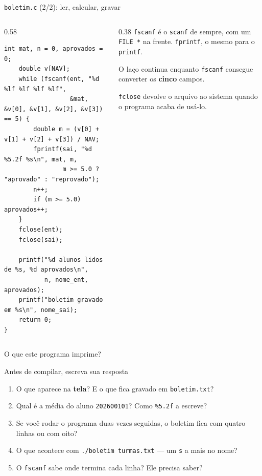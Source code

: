 \documentclass[aspectratio=169]{beamer}
\begin{document}
\begin{frame}[fragile]{\texttt{boletim.c} (2/2): ler, calcular, gravar}
  \vspace{-0.6em}
  \begin{columns}[T]
    \begin{column}{0.58\textwidth}
\begin{lstlisting}[style=codCs]
    int mat, n = 0, aprovados = 0;
    double v[NAV];
    while (fscanf(ent, "%d %lf %lf %lf %lf",
                  &mat, &v[0], &v[1], &v[2], &v[3]) == 5) {
        double m = (v[0] + v[1] + v[2] + v[3]) / NAV;
        fprintf(sai, "%d %5.2f %s\n", mat, m,
                m >= 5.0 ? "aprovado" : "reprovado");
        n++;
        if (m >= 5.0) aprovados++;
    }
    fclose(ent);
    fclose(sai);

    printf("%d alunos lidos de %s, %d aprovados\n",
           n, nome_ent, aprovados);
    printf("boletim gravado em %s\n", nome_sai);
    return 0;
}
\end{lstlisting}
    \end{column}
    \begin{column}{0.38\textwidth}
      \small
      \texttt{fscanf} é o \texttt{scanf} de sempre, com um \texttt{FILE *}
      na frente. \texttt{fprintf}, o mesmo para o \texttt{printf}.

      \medskip
      O laço continua enquanto \texttt{fscanf} consegue converter os
      \textbf{cinco} campos.

      \medskip
      \texttt{fclose} devolve o arquivo ao sistema quando o programa acaba
      de usá-lo.
    \end{column}
  \end{columns}
\end{frame}

\begin{frame}{O que este programa imprime?}
  \begin{block}{Antes de compilar, escreva sua resposta}
    \begin{enumerate}
      \item O que aparece na \textbf{tela}? E o que fica gravado em
        \texttt{boletim.txt}?
      \item Qual é a média do aluno \texttt{202600101}? Como
        \texttt{\%5.2f} a escreve?
      \item Se você rodar o programa duas vezes seguidas, o boletim fica com
        quatro linhas ou com oito?
      \item O que acontece com \texttt{./boletim turmas.txt} --- um
        \texttt{s} a mais no nome?
      \item O \texttt{fscanf} sabe onde termina cada linha? Ele precisa saber?
    \end{enumerate}
  \end{block}
\end{frame}
\end{document}
